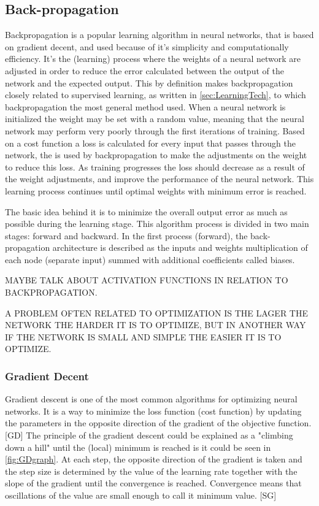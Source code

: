   
\subsection{Back-propagation}
Backpropagation is a popular learning algorithm in neural networks, that is based on gradient decent, and used because of it's simplicity and computationally efficiency. \citep{Bengio2012, Duda2000}
It's the (learning) process where the weights of a neural network are adjusted in order to reduce the error calculated between the output of the network and the expected output. This by definition makes backpropagation closely related to supervised learning, as written in \ref{sec:LearningTech}, to which backpropagation the most general method used.\citep{Duda2000}  
When a neural network is initialized the weight may be set with a random value, meaning that the neural network may perform very poorly through the first iterations of training. Based on a cost function a loss is calculated for every input that passes through the network, the is used by backpropagation to make the adjustments on the weight to reduce this loss. As training progresses the loss should decrease as a result of the weight adjustments, and improve the performance of the neural network. \citep{LeCun2015, Duda2000, Goodfellow2016}   
This learning process continues until optimal weights with minimum error is reached.\citep{Hameed2016}

The basic idea behind it is to minimize the overall output error as much as possible during the learning stage. This algorithm process is divided in two main stages: forward and backward. In the first process (forward), the back-propagation architecture is described as  the inputs and weights multiplication of each node (separate input) summed with additional coefficients called biases.\citep{Hameed2016} 

MAYBE TALK ABOUT ACTIVATION FUNCTIONS IN RELATION TO BACKPROPAGATION. 

A PROBLEM OFTEN RELATED TO OPTIMIZATION IS THE LAGER THE NETWORK THE HARDER IT IS TO OPTIMIZE, BUT IN ANOTHER WAY IF THE NETWORK IS SMALL AND SIMPLE THE EASIER IT IS TO OPTIMIZE. 

\subsubsection{Gradient Decent}
Gradient descent is one of the most common algorithms for optimizing neural networks. It is a way to minimize the loss function (cost function) by updating the parameters in the opposite direction of the gradient of the objective function.[GD] The principle of the gradient descent could be explained as a "climbing down a hill" until the (local) minimum is reached is it could be seen in \autoref{fig:GDgraph}. At each step, the opposite direction of the gradient is taken and the step size is determined by the value of the learning rate together with the slope of the gradient until the convergence is reached. Convergence means that oscillations of the value are small enough to call it minimum value. [SG]

